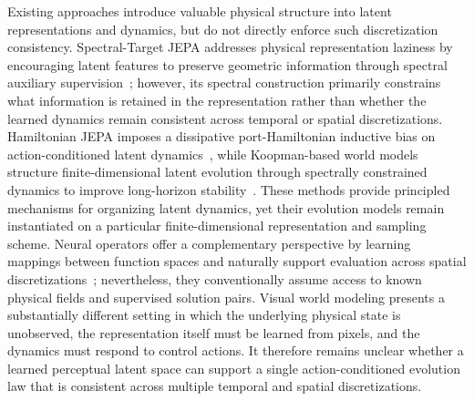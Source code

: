 \documentclass{article}
\theoremstyle{plain}
\theoremstyle{definition}
\theoremstyle{remark}
\begin{document}
Existing approaches introduce valuable physical structure into latent representations and dynamics, but do not directly enforce such discretization consistency. Spectral-Target JEPA addresses physical representation laziness by encouraging latent features to preserve geometric information through spectral auxiliary supervision~\citep{zhu2026spectral}; however, its spectral construction primarily constrains what information is retained in the representation rather than whether the learned dynamics remain consistent across temporal or spatial discretizations. Hamiltonian JEPA imposes a dissipative port-Hamiltonian inductive bias on action-conditioned latent dynamics~\citep{zoabi2026hjjepa}, while Koopman-based world models structure finite-dimensional latent evolution through spectrally constrained dynamics to improve long-horizon stability~\citep{li2026koopman}. These methods provide principled mechanisms for organizing latent dynamics, yet their evolution models remain instantiated on a particular finite-dimensional representation and sampling scheme. Neural operators offer a complementary perspective by learning mappings between function spaces and naturally support evaluation across spatial discretizations~\citep{lu2021deeponet,li2021fno,kovachki2023neuraloperator}; nevertheless, they conventionally assume access to known physical fields and supervised solution pairs. Visual world modeling presents a substantially different setting in which the underlying physical state is unobserved, the representation itself must be learned from pixels, and the dynamics must respond to control actions. It therefore remains unclear whether a learned perceptual latent space can support a single action-conditioned evolution law that is consistent across multiple temporal and spatial discretizations.
\end{document}
